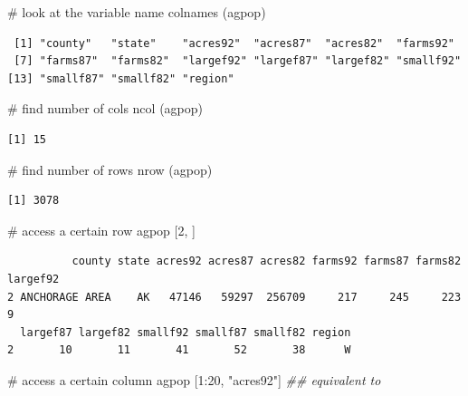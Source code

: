 \documentclass[
  letterpaper,
]{scrbook}
\newenvironment{Shaded}{\begin{snugshade}}{\end{snugshade}}
\newcommand{\CommentTok}[1]{\textcolor[rgb]{0.37,0.37,0.37}{#1}}
\newcommand{\DecValTok}[1]{\textcolor[rgb]{0.68,0.00,0.00}{#1}}
\newcommand{\DocumentationTok}[1]{\textcolor[rgb]{0.37,0.37,0.37}{\textit{#1}}}
\newcommand{\FunctionTok}[1]{\textcolor[rgb]{0.28,0.35,0.67}{#1}}
\newcommand{\NormalTok}[1]{\textcolor[rgb]{0.00,0.23,0.31}{#1}}
\newcommand{\SpecialCharTok}[1]{\textcolor[rgb]{0.37,0.37,0.37}{#1}}
\newcommand{\StringTok}[1]{\textcolor[rgb]{0.13,0.47,0.30}{#1}}
\begin{document}
\begin{Shaded}
\begin{Highlighting}[]
\CommentTok{\# look at the variable name}
\FunctionTok{colnames}\NormalTok{ (agpop) }
\end{Highlighting}
\end{Shaded}

\begin{verbatim}
 [1] "county"   "state"    "acres92"  "acres87"  "acres82"  "farms92" 
 [7] "farms87"  "farms82"  "largef92" "largef87" "largef82" "smallf92"
[13] "smallf87" "smallf82" "region"  
\end{verbatim}

\begin{Shaded}
\begin{Highlighting}[]
\CommentTok{\# find number of cols}
\FunctionTok{ncol}\NormalTok{ (agpop) }
\end{Highlighting}
\end{Shaded}

\begin{verbatim}
[1] 15
\end{verbatim}

\begin{Shaded}
\begin{Highlighting}[]
\CommentTok{\# find number of rows}
\FunctionTok{nrow}\NormalTok{ (agpop) }
\end{Highlighting}
\end{Shaded}

\begin{verbatim}
[1] 3078
\end{verbatim}

\begin{Shaded}
\begin{Highlighting}[]
\CommentTok{\# access a certain row }
\NormalTok{agpop [}\DecValTok{2}\NormalTok{, ]}
\end{Highlighting}
\end{Shaded}

\begin{verbatim}
          county state acres92 acres87 acres82 farms92 farms87 farms82 largef92
2 ANCHORAGE AREA    AK   47146   59297  256709     217     245     223        9
  largef87 largef82 smallf92 smallf87 smallf82 region
2       10       11       41       52       38      W
\end{verbatim}

\begin{Shaded}
\begin{Highlighting}[]
\CommentTok{\# access a certain column}
\NormalTok{agpop [}\DecValTok{1}\SpecialCharTok{:}\DecValTok{20}\NormalTok{, }\StringTok{"acres92"}\NormalTok{] }\DocumentationTok{\#\# equivalent to }
\end{Highlighting}
\end{Shaded}
\end{document}
